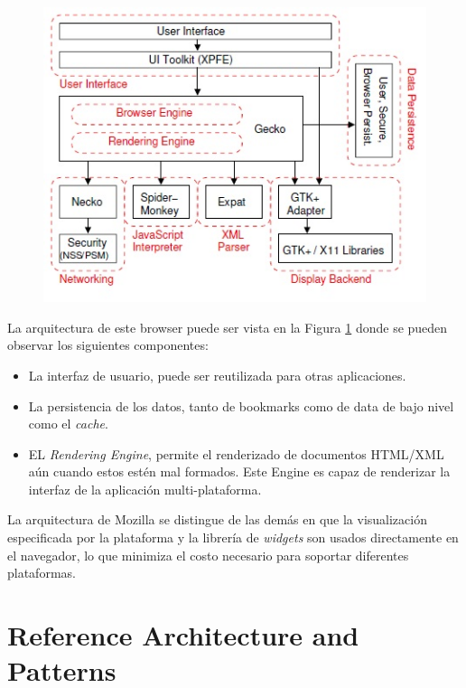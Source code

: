     \begin{figure}[h!t]
        \begin{center}
    		\includegraphics[scale=0.8]{figures/archMoz.jpg}
          \label{fig:archM}
        \end{center}
    \end{figure}
            
    La arquitectura de este browser puede ser vista en la Figura \ref{fig:archM} donde se pueden observar los siguientes componentes:
            \begin{itemize}
                \item La interfaz de usuario, puede ser reutilizada para otras aplicaciones.
                \item La persistencia de los datos, tanto de bookmarks como de data de bajo nivel como el \textit{cache}.
                \item EL \textit{Rendering Engine}, permite el renderizado de documentos HTML/XML aún cuando estos estén mal formados. Este Engine es capaz de renderizar la interfaz de la aplicación multi-plataforma.
            \end{itemize}
    La arquitectura de Mozilla se distingue de las demás en que la visualización especificada por la plataforma y la librería de \textit{widgets} son usados directamente en el navegador, lo que minimiza el costo necesario para soportar diferentes plataformas.
            



\section{Reference Architecture and Patterns}
\label{chap3:ArqRefBrowandPatt}

